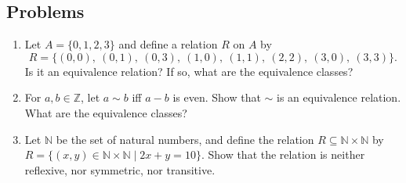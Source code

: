 \documentclass{article}
\begin{document}
\subsection*{Problems}
\begin{enumerate}
    \item Let \( A = \{0, 1, 2, 3\} \) and define a relation \( R \) on \( A \) by
\[
R = \{(0,0),\ (0,1),\ (0,3),\ (1,0),\ (1,1),\ (2,2),\ (3,0),\ (3,3)\}.
\] Is it an equivalence relation? If so, what are the equivalence classes?
\item For $a,b\in \mathbb Z$, let $a\sim b$ iff $a-b$ is even. Show that $\sim$ is an equivalence relation. {What are the equivalence classes}?
\item Let \( \mathbb{N} \) be the set of natural numbers, and define the relation \( R \subseteq \mathbb{N} \times \mathbb{N} \) by
$R = \{ (x, y) \in \mathbb{N} \times \mathbb{N} \mid 2x + y = 10 \}.$ Show that the relation is neither reflexive, nor symmetric, nor transitive.





\end{enumerate}
\end{document}

